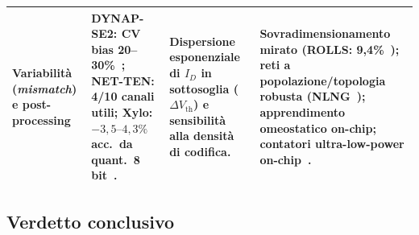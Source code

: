 \begin{table}[htb]
\begin{tabularx}{\textwidth}{@{}L{2.3cm} L{3.25cm} Y Y@{}}
    \textbf{Variabilità (\emph{mismatch}) e post-processing} & DYNAP-SE2: CV bias 20--30\%~\cite{bartels2025}; NET-TEN: 4/10 canali utili; Xylo: $-3{,}5\text{--}4{,}3\%$ acc.\ da quant.\ 8 bit~\cite{li2024}. & Dispersione esponenziale di $I_D$ in sottosoglia ($\Delta V_{\mathrm{th}}$) e sensibilità alla densità di codifica. & Sovradimensionamento mirato (ROLLS: 9,4\%~\cite{qiao2015}); reti a popolazione/topologia robusta (NLNG~\cite{bartels2025}); apprendimento omeostatico on-chip; contatori ultra-low-power on-chip~\cite{ronchini2023}. \\
    \bottomrule
  \end{tabularx}
  \vspace{-6pt}
\end{table}

\FloatBarrier
\vspace{-4pt}
\subsection{Verdetto conclusivo}
\label{subsec:verdetto}

